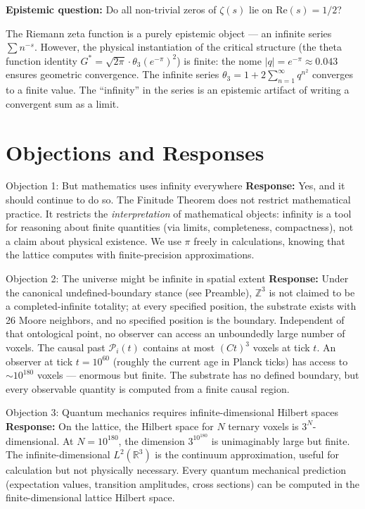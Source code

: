\documentclass[11pt]{article}
\theoremstyle{tight}
\theoremstyle{plainroman}
\newcommand{\R}{\mathbb{R}}
\newcommand{\Z}{\mathbb{Z}}
\begin{document}
\textbf{Epistemic question:} Do all non-trivial zeros of $\zeta(s)$ lie on $\mathrm{Re}(s)=1/2$?

The Riemann zeta function is a purely epistemic object --- an infinite series $\sum n^{-s}$.
However, the physical instantiation of the critical structure (the theta function identity $G^*=\sqrt{2\pi}\cdot\theta_3(e^{-\pi})^2$) is finite: the nome $|q|=e^{-\pi}\approx 0.043$ ensures geometric convergence.
The infinite series $\theta_3=1+2\sum_{n=1}^\infty q^{n^2}$ converges to a finite value.
The ``infinity'' in the series is an epistemic artifact of writing a convergent sum as a limit.

\section{Objections and Responses}

\begin{statusbox}{Objection 1: But mathematics uses infinity everywhere}
\textbf{Response:} Yes, and it should continue to do so.
The Finitude Theorem does not restrict mathematical practice.
It restricts the \emph{interpretation} of mathematical objects: infinity is a tool for reasoning about finite quantities (via limits, completeness, compactness), not a claim about physical existence.
We use $\pi$ freely in calculations, knowing that the lattice computes with finite-precision approximations.
\end{statusbox}

\begin{statusbox}{Objection 2: The universe might be infinite in spatial extent}
\textbf{Response:} Under the canonical undefined-boundary stance (see Preamble), $\Z^3$ is not claimed to be a completed-infinite totality; at every specified position, the substrate exists with 26 Moore neighbors, and no specified position is the boundary. Independent of that ontological point, no observer can access an unboundedly large number of voxels.
The causal past $\mathcal P_i(t)$ contains at most $(Ct)^3$ voxels at tick $t$.
An observer at tick $t=10^{60}$ (roughly the current age in Planck ticks) has access to $\sim 10^{180}$ voxels --- enormous but finite.
The substrate has no defined boundary, but every observable quantity is computed from a finite causal region.
\end{statusbox}

\begin{statusbox}{Objection 3: Quantum mechanics requires infinite-dimensional Hilbert spaces}
\textbf{Response:} On the lattice, the Hilbert space for $N$ ternary voxels is $3^N$-dimensional.
At $N=10^{180}$, the dimension $3^{10^{180}}$ is unimaginably large but finite.
The infinite-dimensional $L^2(\R^3)$ is the continuum approximation, useful for calculation but not physically necessary.
Every quantum mechanical prediction (expectation values, transition amplitudes, cross sections) can be computed in the finite-dimensional lattice Hilbert space.
\end{statusbox}
\end{document}
